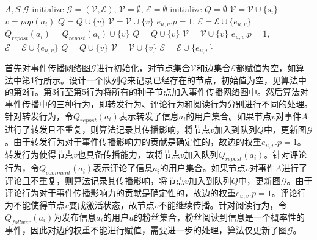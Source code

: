 \begin{algorithm}[!ht]
    \caption{$Merge(A,S)$}
    \label{alg:affairDiff}
    \begin{algorithmic}[1]
	\REQUIRE $A,S$
    \ENSURE $\mathcal{G}$
    \STATE initialize $\mathcal{G}=\left(\mathcal{V},\mathcal{E}\right)$, $\mathcal{V}=\emptyset$, $\mathcal{E}=\emptyset$
    \STATE initialize $Q = \emptyset$
    		\STATE $\mathcal{V} = \mathcal{V} \cup \{s_i\}$
    	\ENDFOR
    		\STATE $v = pop\left(a_i\right)$
    					\STATE $Q = Q \cup \{v\}$
    					\STATE $\mathcal{V} = \mathcal{V} \cup \{v\}$
    					\STATE $e_{u,v}.p = 1$, $\mathcal{E} = \mathcal{E} \cup \{e_{u,v}\}$
    					\STATE $Q_{repost}\left(a_i\right)=Q_{repost}\left(a_i\right) \cup \{v\}$		
    				\ENDWHILE
    			\ENDIF
    				\STATE $Q = Q \cup \{v\}$
    				\STATE $\mathcal{V} = \mathcal{V} \cup \{v\}$
    				\STATE $e_{u,v}.p = 1$, $\mathcal{E} = \mathcal{E} \cup \{e_{u,v}\}$
    			\ENDIF
    				\STATE $Q = Q \cup \{v\}$
    				\STATE $\mathcal{V} = \mathcal{V} \cup \{v\}$
    				\STATE $\mathcal{E} = \mathcal{E} \cup \{e_{u,v}\}$
    			\ENDIF
    		\ENDIF
    	\ENDFOR
    \end{algorithmic}
\end{algorithm}

首先对事件传播网络图$\mathcal{G}$进行初始化，对节点集合$\mathcal{V}$和边集合$\mathcal{E}$都赋值为空，如算法中第1行所示。设计一个队列$Q$来记录已经存在的节点，初始值为空，见算法中的第2行。第3行至第5行为将所有的种子节点加入事件传播网络图中。然后算法对事件传播中的三种行为，即转发行为、评论行为和阅读行为分别进行不同的处理。针对转发行为，令$Q_{repost}\left(a_i\right)$表示转发了信息$a_i$的用户集合。如果节点$v$对事件$A$进行了转发且不重复，则算法记录其传播影响，将节点$v$加入到队列$Q$中，更新图$\mathcal{G}$。由于转发行为对于事件传播影响力的贡献是确定性的，故边的权重$e_{u,v}.p = 1$。转发行为使得节点$v$也具备传播能力，故将节点$v$加入队列$Q_{repost}\left(a_i\right)$。针对评论行为，令$Q_{comment}\left(a_i\right)$表示评论了信息$a_i$的用户集合。如果节点$v$对事件$A$进行了评论且不重复，则算法记录其传播影响，将节点$v$加入到队列$Q$中，更新图$\mathcal{G}$。由于评论行为对于事件传播影响力的贡献是确定性的，故边的权重$e_{u,v}.p = 1$。评论行为不能使得节点$v$变成激活状态，故节点$v$不能继续传播。针对阅读行为，令$Q_{follwer}\left(a_i\right)$为发布信息$a_i$的用户$u$的粉丝集合，粉丝阅读到信息是一个概率性的事件，因此对边的权重不能进行赋值，需要进一步的处理，算法仅更新了图$\mathcal{G}$。

